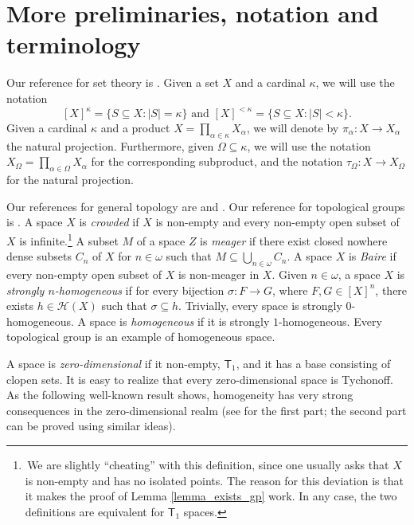 \documentclass{amsart}
\theoremstyle{plain}
\theoremstyle{definition}
\newcommand{\HH}{\mathcal{H}}
\begin{document}
\section{More preliminaries, notation and terminology}\label{section_preliminaries}

Our reference for set theory is \cite{kunen}. Given a set $X$ and a cardinal $\kappa$, we will use the notation
$$
[X]^\kappa=\{S\subseteq X:|S|=\kappa\}\text{ and }[X]^{<\kappa}=\{S\subseteq X:|S|<\kappa\}.
$$
Given a cardinal $\kappa$ and a product $X=\prod_{\alpha\in\kappa}X_\alpha$, we will denote by $\pi_\alpha:X\longrightarrow X_\alpha$ the natural projection. Furthermore, given $\Omega\subseteq\kappa$, we will use the notation $X_\Omega=\prod_{\alpha\in\Omega}X_\alpha$ for the corresponding subproduct, and the notation $\tau_\Omega:X\longrightarrow X_\Omega$ for the natural projection.

Our references for general topology are \cite{engelking} and \cite{van_mill_book}. Our reference for topological groups is \cite{arhangelskii_tkachenko}. A space $X$ is \emph{crowded} if $X$ is non-empty and every non-empty open subset of $X$ is infinite.\footnote{\,We are slightly ``cheating'' with this definition, since one usually asks that $X$ is non-empty and has no isolated points. The reason for this deviation is that it makes the proof of Lemma \ref{lemma_exists_gp} work. In any case, the two definitions are equivalent for $\mathsf{T}_1$ spaces.} A subset $M$ of a space $Z$ is \emph{meager} if there exist closed nowhere dense subsets $C_n$ of $X$ for $n\in\omega$ such that $M\subseteq\bigcup_{n\in\omega}C_n$. A space $X$ is \emph{Baire} if every non-empty open subset of $X$ is non-meager in $X$. Given $n\in\omega$, a space $X$ is \emph{strongly $n$-homogeneous} if for every bijection $\sigma:F\longrightarrow G$, where $F,G\in [X]^n$, there exists $h\in\HH(X)$ such that $\sigma\subseteq h$. Trivially, every space is strongly $0$-homogeneous. A space is \emph{homogeneous} if it is strongly $1$-homogeneous. Every topological group is an example of homogeneous space.

A space is \emph{zero-dimensional} if it non-empty, $\mathsf{T}_1$, and it has a base consisting of clopen sets. It is easy to realize that every zero-dimensional space is Tychonoff. As the following well-known result shows, homogeneity has very strong consequences in the zero-dimensional realm (see \cite[proof of Lemma 1.9.4]{van_mill_book} for the first part; the second part can be proved using similar ideas).
\end{document}

